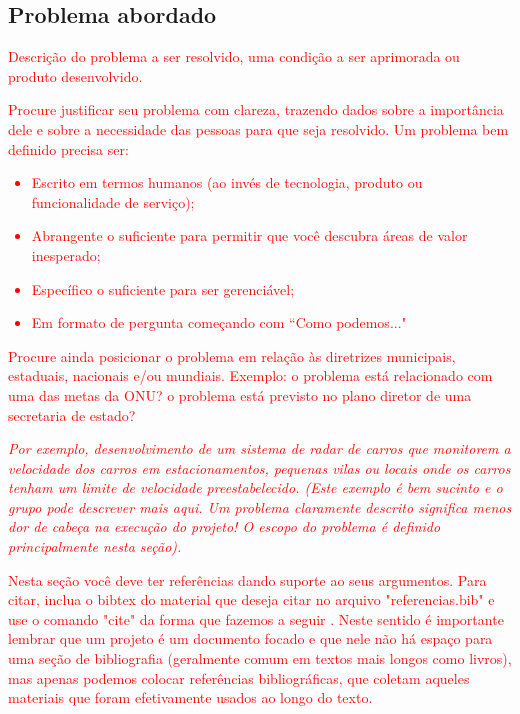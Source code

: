 \subsection{Problema abordado}
\label{sec:problema}

\textcolor{red}{Descrição do problema a ser resolvido, uma condição a ser aprimorada ou produto desenvolvido.}

\textcolor{red}{Procure justificar seu problema com clareza, trazendo dados sobre a importância dele e sobre a necessidade das pessoas para que seja resolvido. Um problema bem definido  precisa ser:
\begin{itemize}
    \item Escrito em termos humanos (ao invés de tecnologia, produto ou funcionalidade de serviço);
    \item Abrangente o suficiente para permitir que você descubra áreas de valor inesperado;
    \item Específico o suficiente para ser gerenciável;
    \item Em formato de pergunta começando com “Como podemos..."
\end{itemize}}

\textcolor{red}{Procure ainda posicionar o problema em relação às diretrizes municipais, estaduais, nacionais e/ou mundiais. Exemplo: o problema está relacionado com uma das metas da ONU? o problema está previsto no plano diretor de uma secretaria de estado?}

\textcolor{red}{\textit{Por exemplo, desenvolvimento de um sistema de radar de carros que monitorem a velocidade dos carros em estacionamentos, pequenas vilas ou locais onde os carros tenham um limite de velocidade preestabelecido. (Este exemplo é bem sucinto e o grupo pode descrever mais aqui. Um problema claramente descrito significa menos dor de cabeça na execução do projeto! O escopo do  problema é definido principalmente nesta seção).}}

\textcolor{red}{
Nesta seção você deve ter referências dando suporte ao seus argumentos. Para citar, inclua o bibtex do material que deseja citar no arquivo "referencias.bib" e use o comando "cite" da forma que fazemos a seguir \cite{lee2020deep}. Neste sentido é importante lembrar que um projeto é um documento focado e que nele não há espaço para uma seção de bibliografia (geralmente comum em textos mais longos como livros), mas apenas podemos colocar referências bibliográficas, que coletam aqueles materiais que foram efetivamente usados ao longo do texto.}

